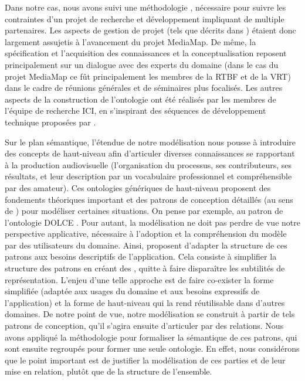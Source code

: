 Dans notre cas, nous avons suivi une méthodologie , nécessaire pour suivre les contraintes d'un projet de recherche et développement impliquant de multiple partenaires.
Les aspects de gestion de projet (tels que décrits dans ) étaient donc largement assujetis à l'avancement du projet MediaMap.
De même, la spécification et l'acquisition des connaissances et la conceptualisation reposent principalement sur un dialogue avec des experts du domaine (dans le cas du projet MediaMap ce fût principalement les membres de la RTBF et de la VRT) dans le cadre de réunions générales et de séminaires plus focalisés.
Les autres aspects de la construction de l'ontologie ont été réalisés par les membres de l'équipe de recherche ICI, en s'inspirant des séquences de développement technique proposées par .

Sur le plan sémantique, l'étendue de notre modélisation nous pousse à introduire des concepts de haut-niveau afin d'articuler diverses connaissances se rapportant à la production audiovisuelle (l'organisation du processus, ses contributeurs, ses résultats, et leur description par un vocabulaire professionnel et compréhensible par des amateur).
Ces ontologies génériques de haut-niveau proposent des fondements théoriques important et des patrons de conception détaillés (au sens de \cite{Isaac2005}) pour modéliser certaines situations. 
On pense par exemple, au patron  de l'ontologie DOLCE . 
Pour autant, la modélisation ne doit pas perdre de vue notre perspective applicative, nécessaire à l'adoption et la compréhension du modèle par des utilisateurs du domaine.
Ainsi, \citeauthor{Isaac2005} proposent d'adapter la structure de ces patrons aux besoins descriptifs de l'application.
Cela consiste à simplifier la structure des patrons en créant des , quitte à faire disparaître les subtilités de représentation.
L'enjeu d'une telle approche est de faire co-exister la forme simplifiée (adaptée aux usages du domaine et aux besoins expressifs de l'application) et la forme de haut-niveau qui la rend réutilisable dans d'autres domaines.
De notre point de vue, notre modélisation se construit à partir de tels patrons de conception, qu'il s'agira ensuite d'articuler par des relations. 
Nous avons appliqué la méthodologie  pour formaliser la sémantique de ces patrons, qui sont ensuite regroupés pour former une seule ontologie.
En effet, nous considérons que le point important est de justifier la modélisation de ces parties et de leur mise en relation, plutôt que de la structure de l'ensemble.














